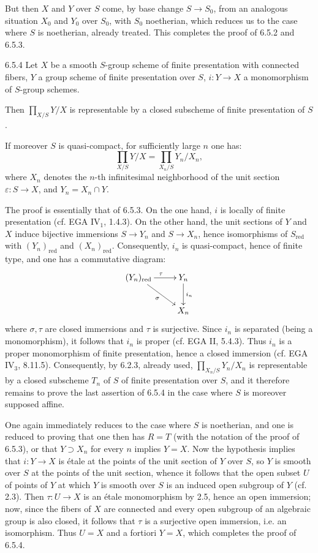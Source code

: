 But then $X$ and $Y$ over $S$ come, by base change $S\to S_0$, from an analogous situation $X_0$ and $Y_0$ over $S_0$, with $S_0$ noetherian, which reduces us to the case where $S$ is noetherian, already treated. This completes the proof of 6.5.2 and 6.5.3.
\begin{corollary}{6.5.4}\label{VIB.6.5.4}
Let $X$ be a smooth $S$-group scheme of finite presentation with connected fibers, $Y$ a group scheme of finite presentation over $S$, $i:Y\to X$ a monomorphism of $S$-group schemes.
\begin{enumeratei}
\item Then $\prod_{X/S}Y/X$ is representable by a closed subscheme of finite presentation of $S$.
\item If moreover $S$ is quasi-compact, for sufficiently large $n$ one has:
\[
\prod_{X/S}Y/X=\prod_{X_n/S}Y_n/X_n,
\]
where $X_n$ denotes the $n$-th infinitesimal neighborhood of the unit section $\varepsilon:S\to X$, and $Y_n=X_n\cap Y$.
\end{enumeratei}
\end{corollary}
The proof is essentially that of 6.5.3. On the one hand, $i$ is locally of finite presentation (cf. EGA IV$_1$, 1.4.3). On the other hand, the unit sections of $Y$ and $X$ induce bijective immersions $S\to Y_n$ and $S\to X_n$, hence isomorphisms of $S_{\mathrm{red}}$ with $(Y_n)_{\mathrm{red}}$ and $(X_n)_{\mathrm{red}}$. Consequently, $i_n$ is quasi-compact, hence of finite type, and one has a commutative diagram:
\[
\xymatrix{(Y_n)_{\mathrm{red}}\ar[r]^\tau\ar[dr]_\sigma&Y_n\ar[d]^{i_n}\\&X_n}
\]
where $\sigma,\tau$ are closed immersions and $\tau$ is surjective. Since $i_n$ is separated (being a monomorphism), it follows that $i_n$ is proper (cf. EGA II, 5.4.3). Thus $i_n$ is a proper monomorphism of finite presentation, hence a closed immersion (cf. EGA IV$_3$, 8.11.5). Consequently, by 6.2.3, already used, $\prod_{X_n/S}Y_n/X_n$ is representable by a closed subscheme $T_n$ of $S$ of finite presentation over $S$, and it therefore remains to prove the last assertion of 6.5.4 in the case where $S$ is moreover supposed affine.

One again immediately reduces to the case where $S$ is noetherian, and one is reduced to proving that one then has $R=T$ (with the notation of the proof of 6.5.3), or that $Y\supset X_n$ for every $n$ implies $Y=X$. Now the hypothesis implies that $i:Y\to X$ is étale at the points of the unit section of $Y$ over $S$, so $Y$ is smooth over $S$ at the points of the unit section, whence it follows that the open subset $U$ of points of $Y$ at which $Y$ is smooth over $S$ is an induced open subgroup of $Y$ (cf. 2.3). Then $\tau:U\to X$ is an étale monomorphism by 2.5, hence an open immersion; now, since the fibers of $X$ are connected and every open subgroup of an algebraic group is also closed, it follows that $\tau$ is a surjective open immersion, i.e. an isomorphism. Thus $U=X$ and a fortiori $Y=X$, which completes the proof of 6.5.4.

